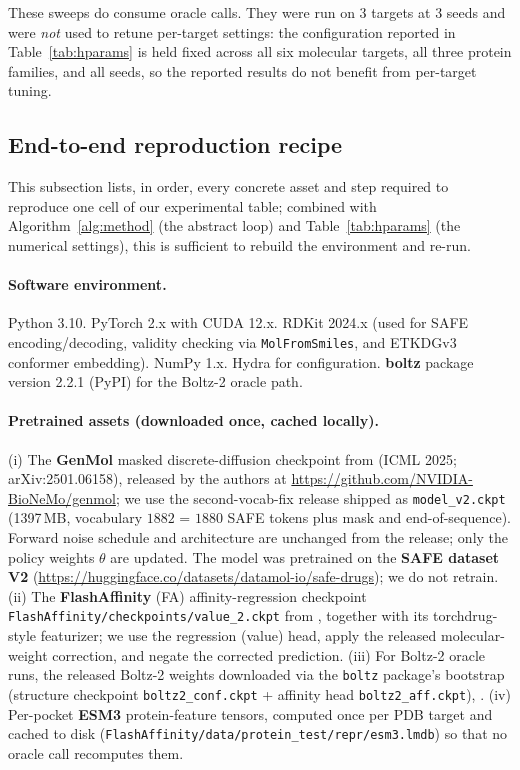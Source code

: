 \documentclass{article}
\begin{document}
These sweeps do consume oracle calls. They were run on $3$ targets at $3$ seeds and were \emph{not} used to retune per-target settings: the configuration reported in Table~\ref{tab:hparams} is held fixed across all six molecular targets, all three protein families, and all seeds, so the reported results do not benefit from per-target tuning.


\subsection{End-to-end reproduction recipe}\label{app:repro-recipe}

This subsection lists, in order, every concrete asset and step required to reproduce one cell of our experimental table; combined with Algorithm~\ref{alg:method} (the abstract loop) and Table~\ref{tab:hparams} (the numerical settings), this is sufficient to rebuild the environment and re-run.

\paragraph{Software environment.} Python 3.10. PyTorch 2.x with CUDA 12.x. RDKit 2024.x (used for SAFE encoding/decoding, validity checking via \texttt{MolFromSmiles}, and ETKDGv3 conformer embedding). NumPy 1.x. Hydra for configuration. \textbf{boltz} package version 2.2.1 (PyPI) for the Boltz-2 oracle path.

\paragraph{Pretrained assets (downloaded once, cached locally).} (i) The \textbf{GenMol} masked discrete-diffusion checkpoint from \citet{leeGenMolDrugDiscovery2025} (ICML 2025; arXiv:2501.06158), released by the authors at \url{https://github.com/NVIDIA-BioNeMo/genmol}; we use the second-vocab-fix release shipped as \texttt{model\_v2.ckpt} (1397\,MB, vocabulary $1882$ = $1880$ SAFE tokens plus mask and end-of-sequence). Forward noise schedule and architecture are unchanged from the release; only the policy weights $\theta$ are updated. The model was pretrained on the \textbf{SAFE dataset V2} (\url{https://huggingface.co/datasets/datamol-io/safe-drugs}); we do not retrain. (ii) The \textbf{FlashAffinity} (FA) affinity-regression checkpoint
\texttt{FlashAffinity/checkpoints/value\_2.ckpt}
from \citet{jiangFlashAffinityBridgingAccuracySpeed},
together with its torchdrug-style featurizer; we use the regression
(value) head, apply the released molecular-weight correction,
and negate the corrected prediction. (iii) For Boltz-2 oracle runs, the released Boltz-2 weights downloaded via the \texttt{boltz} package's bootstrap (structure checkpoint \texttt{boltz2\_conf.ckpt} + affinity head \texttt{boltz2\_aff.ckpt}), \citet{passaro2025boltz2}. (iv) Per-pocket \textbf{ESM3} protein-feature tensors, computed once per PDB target and cached to disk (\texttt{FlashAffinity/data/protein\_test/repr/esm3.lmdb}) so that no oracle call recomputes them.
\end{document}
